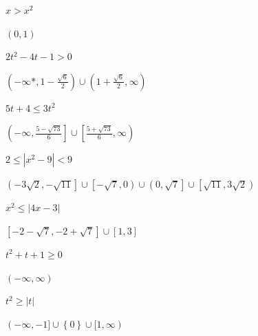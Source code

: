 \documentclass{ximera}
\begin{document}
\begin{question}
\begin{problem}
$x > x^{2}$

\begin{solution}
    $(0, 1)$
\end{solution}
\end{problem}

\begin{problem}
$2t^2-4t-1 > 0$

\begin{solution}
    $\left(-\infty*, 1-\frac{\sqrt{6}}{2} \right) \cup \left(1+\frac{\sqrt{6}}{2}, \infty \right)$
\end{solution}
\end{problem}

\begin{problem}
$5t+4 \leq 3t^2$

\begin{solution}
    $\left(-\infty, \frac{5 - \sqrt{73}}{6} \right] \cup \left[\frac{5 + \sqrt{73}}{6}, \infty \right)$
\end{solution}
\end{problem}

\begin{problem}
$2 \leq |x^{2} - 9| < 9$

\begin{solution}
$\left(-3\sqrt{2}, -\sqrt{11} \right] \cup \left[-\sqrt{7}, 0 \right) \cup \left(0, \sqrt{7} \right] \cup \left[\sqrt{11}, 3\sqrt{2} \right)$
\end{solution}
\end{problem}

\begin{problem}
$x^{2} \leq |4x - 3|$

\begin{solution}
    $\left[-2-\sqrt{7}, -2+\sqrt{7} \right] \cup [1, 3]$
\end{solution}
\end{problem}


\begin{problem}
$t^{2} + t + 1 \geq 0$

\begin{solution}
    $(-\infty, \infty)$
\end{solution}
\end{problem}

\begin{problem}
$t^2 \geq |t|$ 

\begin{solution}
    $(-\infty, -1] \cup \left\{ 0 \right\} \cup [1,\infty)$
\end{solution}
\end{problem}


\end{question}
\end{document}
